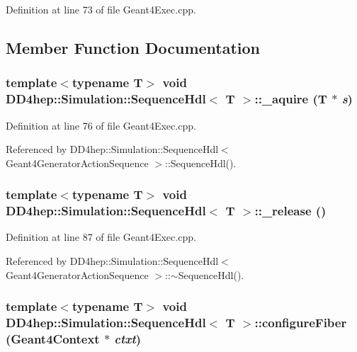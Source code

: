 Definition at line 73 of file Geant4Exec.cpp.

\subsection{Member Function Documentation}
\hypertarget{class_d_d4hep_1_1_simulation_1_1_sequence_hdl_afe240bb5982f0cdaedc001a3cc1a50da}{
\subsubsection[{\_\-aquire}]{\setlength{\rightskip}{0pt plus 5cm}template$<$typename T$>$ void {\bf DD4hep::Simulation::SequenceHdl}$<$ {\bf T} $>$::\_\-aquire ({\bf T} $\ast$ {\em s})}}
\label{class_d_d4hep_1_1_simulation_1_1_sequence_hdl_afe240bb5982f0cdaedc001a3cc1a50da}


Definition at line 76 of file Geant4Exec.cpp.

Referenced by DD4hep::Simulation::SequenceHdl$<$ Geant4GeneratorActionSequence $>$::SequenceHdl().\hypertarget{class_d_d4hep_1_1_simulation_1_1_sequence_hdl_ad76a439f79bc1844bbcb33e3395c8454}{
\subsubsection[{\_\-release}]{\setlength{\rightskip}{0pt plus 5cm}template$<$typename T$>$ void {\bf DD4hep::Simulation::SequenceHdl}$<$ {\bf T} $>$::\_\-release ()}}
\label{class_d_d4hep_1_1_simulation_1_1_sequence_hdl_ad76a439f79bc1844bbcb33e3395c8454}


Definition at line 87 of file Geant4Exec.cpp.

Referenced by DD4hep::Simulation::SequenceHdl$<$ Geant4GeneratorActionSequence $>$::$\sim$SequenceHdl().\hypertarget{class_d_d4hep_1_1_simulation_1_1_sequence_hdl_a4672c0e560cdc353b48c8025c9d3546f}{
\subsubsection[{configureFiber}]{\setlength{\rightskip}{0pt plus 5cm}template$<$typename T$>$ void {\bf DD4hep::Simulation::SequenceHdl}$<$ {\bf T} $>$::configureFiber ({\bf Geant4Context} $\ast$ {\em ctxt})}}
\label{class_d_d4hep_1_1_simulation_1_1_sequence_hdl_a4672c0e560cdc353b48c8025c9d3546f}


